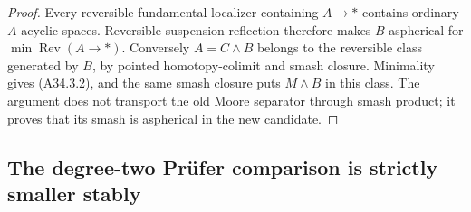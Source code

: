 \begin{proof}
Every reversible fundamental localizer containing $A\to *$
contains ordinary $A$-acyclic spaces.  Reversible suspension
reflection therefore makes $B$ aspherical for
$\min\operatorname{Rev}(A\to *)$.  Conversely $A=C\wedge B$
belongs to the reversible class generated by $B$, by pointed
homotopy-colimit and smash closure.  Minimality gives
\textup{(A34.3.2)}, and the same smash closure puts $M\wedge B$
in this class.  The argument does not transport the old Moore
separator through smash product; it proves that its smash is
aspherical in the new candidate.
\end{proof}

\subsection{The degree-two Pr\"ufer comparison is strictly smaller stably}
\label{sec:A34-prufer}

